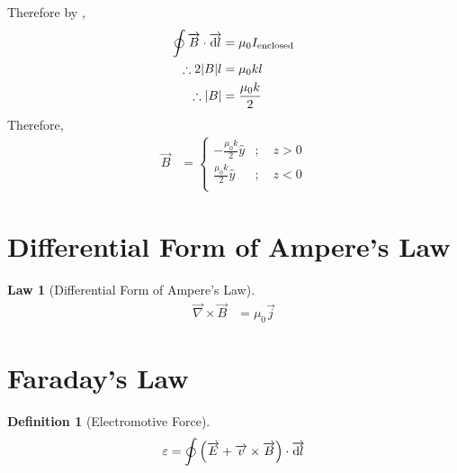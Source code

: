 \documentclass[fleqn, a4paper, 8pt, twoside]{amsart}
\theoremstyle{definition}
\newtheorem{definition}{Definition}
\theoremstyle{theorem}
\newtheorem{law}{Law}
\begin{document}
\begin{multicols}{2}
\begin{spacing}{0.6}
\begin{solution}
\begin{figure}[H]
	\end{figure}
	Therefore by ,
	\begin{align*}
		\oint \overrightarrow{B} \cdot \overrightarrow{\dif l} &= \mu_0 I_{\textnormal{enclosed}}\\
		\therefore 2 |B| l &= \mu_0 k l\\
		\therefore |B| &= \frac{\mu_0 k}{2}
	\end{align*}
	Therefore,
	\begin{align*}
		\overrightarrow{B} &=
			\begin{cases}
				-\frac{\mu_0 k}{2} \hat{y} & ;\quad z > 0 \\
				\frac{\mu_0 k}{2} \hat{y}  & ;\quad z < 0 \\
			\end{cases}
	\end{align*}
\end{solution}

\section{Differential Form of Ampere's Law}

\begin{law}[Differential Form of Ampere's Law]
	\begin{align*}
		\overrightarrow{\nabla} \times \overrightarrow{B} & = \mu_0 \overrightarrow{j}
	\end{align*}
	\label{Differential_Form_of_Ampere's_Law}
\end{law}

\section{Faraday's Law}

\begin{definition}[Electromotive Force]
	\begin{equation*}
		\varepsilon = \oint \left( \overrightarrow{E} + \overrightarrow{v} \times \overrightarrow{B} \right) \cdot \overrightarrow{\dif l}
	\end{equation*}
\end{definition}


\end{spacing}
\end{multicols}
\end{document}
